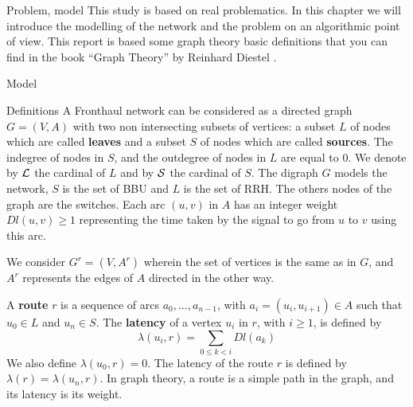 \documentclass[a4paper,10pt]{report}
\begin{document}
\begin{chapter}{Problem, model}
This study is based on real problematics. In this chapter we will introduce the modelling 
of the network and the problem on an algorithmic point of view. This report is based some graph theory basic definitions that you can find in the book ``Graph Theory'' by Reinhard Diestel \cite{diestel2005graph}.
 \begin{section}{Model}
 \begin{subsection}{Definitions}
  A Fronthaul network can be considered as a directed graph $G=(V,A)$ with two non intersecting subsets of vertices: 
  a subset $L$ of nodes which are called {\bf leaves} and a subset $S$ of nodes which are called {\bf sources}.  
The indegree of nodes in $S$, and the outdegree of nodes in $L$ are equal to 0. 
We denote by ${\cal L}$ the cardinal of $L$ and by ${\cal S}$ the cardinal of $S$. The digraph $G$ models the network,
$S$ is the set of BBU and $L$ is the set of RRH. The others nodes of the graph are the switches.
Each arc  $(u,v)$ in $A$ has an integer weight $Dl(u,v) \geq 1$ representing the time taken by the signal to go from $u$ to $v$
 using this arc.

We consider $G^r=(V,A^r)$ wherein the set of vertices is the same as in $G$, and $A^r$ represents the edges of $A$ directed in the other way. 
\newline
\begin{center}
\end{center}

A {\bf route} $r$ is a sequence of arcs $a_0, \ldots , a_{n-1}$, with $a_i=(u_i,u_{i+1}) \in A$ such that $u_0 \in L$ and $u_n \in S$.
The {\bf latency} of a vertex $u_i$ in $r$, with $i \geq 1$, is defined by $$\lambda(u_i,r)= \sum\limits_{0 \leq k <i} Dl(a_k)$$ We also define $\lambda(u_0,r)=0$.
The latency of the route $r$ is defined by $\lambda (r)= \lambda (u_n,r)$. In graph theory, a route is a simple path in the graph, and its latency is its weight. 



\end{subsection}
\end{section}
\end{chapter}
\end{document}
